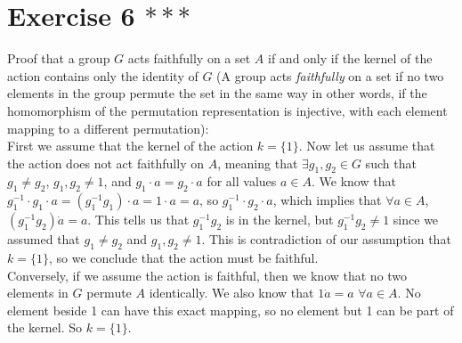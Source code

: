\documentclass{article}
\begin{document}
    \section*{Exercise 6 $***$}
    Proof that a group $G$ acts faithfully on a set $A$ if and only
    if the kernel of the action contains only the identity of $G$
    (A group acts \textit{faithfully} on a set
    if no two elements in the group permute the set in the same way
    in other words, if the homomorphism of the permutation representation
    is injective, with each element mapping to a different permutation): \\
    First we assume that the kernel of the action $k =\{1\}$.
    Now let us assume that the action does not act faithfully on $A$,
    meaning that $\exists g_1, g_2 \in G$
    such that $g_1 \neq g_2$, $g_1, g_2 \neq 1$,
    and $g_1 \cdot a = g_2 \cdot a$ for all values $a \in A$.
    We know that
    $g_1^{-1} \cdot g_1 \cdot a = (g_1^{-1}g_1) \cdot a = 1 \cdot a = a$,
    so $g_1^{-1} \cdot g_2 \cdot a$,
    which implies that $\forall a \in A$,
    $(g_1^{-1}g_2) \dot a = a$.
    This tells us that $g_1^{-1}g_2$ is in the kernel,
    but $g_1^{-1}g_2 \neq 1$
    since we assumed that $g_1 \neq g_2$ and $g_1, g_2 \neq 1$.
    This is contradiction of our assumption that $k =\{1\}$,
    so we conclude that the action must be faithful. \\
    Conversely, if we assume the action is faithful,
    then we know that no two elements in $G$ permute $A$ identically.
    We also know that $1 \dot a = a$ $\forall a \in A$.
    No element beside 1 can have this exact mapping,
    so no element but 1 can be part of the kernel.
    So $k = \{1\}$.
\end{document}
